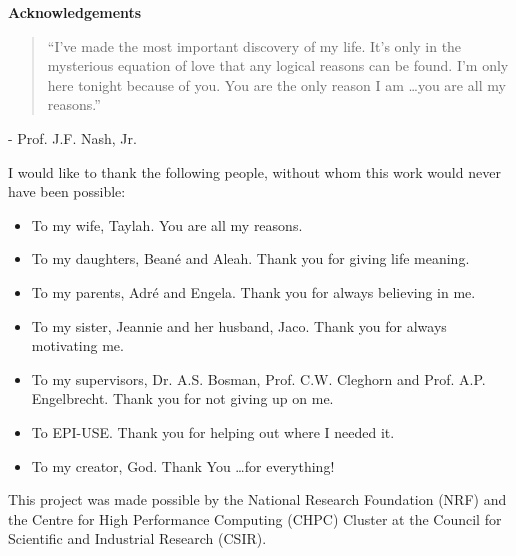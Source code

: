 \pagestyle{empty}
\begin{center}
    \Large
    \textbf{Acknowledgements}
\end{center}

\begin{quotation}
    \noindent ``I've made the most important discovery of my life. It's only in
    the mysterious equation of love that any logical reasons can be found. I'm
    only here tonight because of you. You are the only reason I am \ldots you are
    all my reasons.''
\end{quotation}
\begin{flushright}
    - Prof. J.F. Nash, Jr.
\end{flushright}

\vspace{0.3cm}
\noindent
I would like to thank the following people, without whom this work would never
have been possible:

\begin{itemize}
    \item To my wife, Taylah. You are all my reasons.

    \item To my daughters, Bean\'e and  Aleah. Thank you for giving life meaning.

    \item To my parents, Adr\'e and Engela. Thank you for always believing in me.

    \item To my sister, Jeannie and her husband, Jaco. Thank you for always motivating me.

    \item To my supervisors, Dr. A.S. Bosman, Prof. C.W. Cleghorn and Prof. A.P. Engelbrecht. Thank you for not giving up on me.

    \item To EPI-USE. Thank you for helping out where I needed it.

    \item To my creator, God. Thank You \ldots for everything!
\end{itemize}

\vspace{\fill}

\begin{center}
    This project was made possible by the National Research Foundation (NRF) and the Centre for High Performance Computing (CHPC) Cluster at the Council for Scientific and Industrial Research (CSIR).
\end{center}

\newpage
